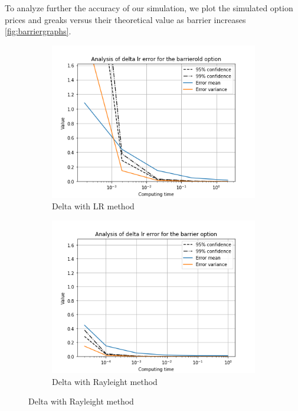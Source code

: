 \documentclass[11pt,a4paper,fleqn]{article}
\begin{document}
To analyze further the accuracy of our simulation, we plot the simulated option prices and greaks versus their theoretical value as barrier increases \ref{fig:barriergraphs}.

\begin{figure}[h!]
  \centering
      \begin{subfigure}[b]{0.45\textwidth}
          \includegraphics[width=\textwidth]{graphs/barrierolddeltalrtime.png}
          \caption{Delta with LR method}
      \end{subfigure}
      \begin{subfigure}[b]{0.45\textwidth}
          \includegraphics[width=\textwidth]{graphs/barrierdeltalrtime.png}
          \caption{Delta with Rayleight method}
      \end{subfigure}


\end{figure}
\end{document}

